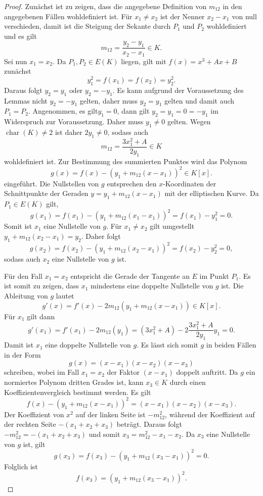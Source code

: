 \begin{proof}
    Zunächst ist zu zeigen, dass die angegebene Definition von \(m_{12}\) in den angegebenen Fällen wohldefiniert ist. Für \(x_1\neq x_2\) ist der Nenner \(x_2-x_1\) von null verschieden, damit ist die Steigung der Sekante durch \(P_1\) und \(P_2\) wohldefiniert und es gilt
    \[
        m_{12}=\frac{y_2-y_1}{x_2-x_1}\in K.
    \]
    Sei nun \(x_1=x_2\). Da \(P_1,P_2\in E(K)\) liegen, gilt mit \(f(x)=x^3+Ax+B\)
    zunächst
    \[
        y_1^2=f(x_1)=f(x_2)=y_2^2.
    \]
    Daraus folgt \(y_2=y_1\text{ oder } y_2=-y_1\). Es kann aufgrund der Voraussetzung des Lemmas nicht \(y_2=-y_1\) gelten, daher muss $y_2=y_1$ gelten und damit auch \(P_1=P_2\). Angenommen, es gilt\(y_1=0\), dann gilt $y_2=y_1=0=-y_1$ im Widerspruch zur Voraussetzung. Daher muss \(y_1\neq 0\) gelten. Wegen \(\operatorname{char}(K)\neq2\) ist daher \(2y_1\neq0\), sodass auch
    \[
        m_{12}=\frac{3x_1^2+A}{2y_1}\in K
    \]
    wohldefiniert ist. Zur Bestimmung des summierten Punktes wird das Polynom
    \[
        g(x)=f(x)-{(y_1+m_{12}(x-x_1))}^2\in K[x].
    \]
    eingeführt. Die Nullstellen von \(g\) entsprechen den \(x\)-Koordinaten der Schnittpunkte der Geraden \(y=y_1+m_{12}(x-x_1)\) mit der elliptischen Kurve. Da \(P_1\in E(K)\) gilt,
    \[
        g(x_1)=f(x_1)-{\left(y_1+m_{12}(x_1-x_1)\right)}^2=f(x_1)-y_1^2=0.
    \]
    Somit ist \(x_1\) eine Nullstelle von \(g\). Für \(x_1\neq x_2\) gilt umgestellt \( y_1+m_{12}(x_2-x_1)=y_2\). Daher folgt
    \[
        g(x_2)=f(x_2)-{\left(y_1+m_{12}(x_2-x_1)\right)}^2 =f(x_2)-y_2^2=0,
    \]
    sodass auch  $x_2$ eine Nullstelle von \(g\) ist.

    Für den Fall \(x_1=x_2\) entspricht die Gerade der Tangente an \(E\) im Punkt \(P_1\). Es ist somit zu zeigen, dass \(x_1\) mindestens eine doppelte Nullstelle von \(g\) ist. Die Ableitung von \(g\) lautet
    \[
        g'(x)=f'(x)-2m_{12}\left(y_1+m_{12}(x-x_1)\right) \in K[x].
    \]
    Für $x_1$ gilt dann
    \[
        g'(x_1)=f'(x_1)-2m_{12}(y_1)= (3x_1^2+A)-2\frac{3x_1^2+A}{2y_1}y_1=0.
    \]
    Damit ist \(x_1\) eine doppelte Nullstelle von \(g\). Es lässt sich somit \(g\) in beiden Fällen in der Form
    \[
        g(x)=(x-x_1)(x-x_2)(x-x_3)
    \]
    schreiben, wobei im Fall \(x_1=x_2\) der Faktor \((x-x_1)\) doppelt auftritt. Da \(g\) ein normiertes Polynom dritten Grades ist, kann \(x_3\in K\) durch einen Koeffizientenvergleich bestimmt werden. Es gilt
    \begin{equation}
        \label{eq:faktorisierung-wohldefiniertheit}
        f(x)-{\left(y_1+m_{12}(x-x_1)\right)}^2
        =(x-x_1)(x-x_2)(x-x_3).
    \end{equation}
    Der Koeffizient von \(x^2\) auf der linken Seite ist \(-m_{12}^2\), während der Koeffizient auf der rechten Seite \(-(x_1+x_2+x_3)\) beträgt. Daraus folgt \(-m_{12}^2=-(x_1+x_2+x_3) \)
    und somit \(x_3=m_{12}^2-x_1-x_2\). Da $x_3$ eine Nullstelle von $g$ ist, gilt
    \[
        g(x_3)
        =
        f(x_3)
            -
            {\left(y_1+m_{12}(x_3-x_1)\right)}^2
        =0.
    \]
    Folglich ist
    \[
        f(x_3)
        =
        {\left(y_1+m_{12}(x_3-x_1)\right)}^2.
    \]


\end{proof}
